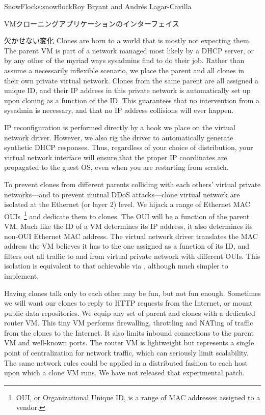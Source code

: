 \begin{aosachapter}{SnowFlock}{s:snowflock}{Roy Bryant and Andr\'e{s} Lagar-Cavilla}
\begin{aosasect1}{VMクローニングアプリケーションのインターフェイス}
\begin{aosasect2}{欠かせない変化}
Clones are born to a world that is mostly not expecting them. The
parent VM is part of a network managed most likely by a DHCP server,
or by any other of the myriad ways sysadmins find to do their
job. Rather than assume a necessarily inflexible scenario, we place
the parent and all clones in their own private virtual network. Clones
from the same parent are all assigned a unique ID, and their IP
address in this private network is automatically set up upon cloning
as a function of the ID\@. This guarantees that no intervention from a
sysadmin is necessary, and that no IP address collisions will ever
happen.

IP reconfiguration is performed directly by a hook we place on the
virtual network driver. However, we also rig the driver to
automatically generate synthetic DHCP responses. Thus, regardless of
your choice of distribution, your virtual network interface will
ensure that the proper IP coordinates are propagated to the guest OS,
even when you are restarting from scratch.

To prevent clones from different parents colliding with each others'
virtual private networks---and to prevent mutual DDoS attacks---clone
virtual network are isolated at the Ethernet (or layer 2) level. We
hijack a range of Ethernet MAC OUIs~\footnote{OUI, or Organizational Unique ID,
is a range of MAC addresses assigned to a vendor.} and dedicate them to clones. The
OUI will be a function of the parent VM\@. Much like the ID of a VM
determines its IP address, it also determines its non-OUI Ethernet MAC
address.  The virtual network driver translates the MAC address the VM
believes it has to the one assigned as a function of its ID, and
filters out all traffic to and from virtual private network with
different OUIs. This isolation is equivalent to that achievable via
, although much simpler to implement.

Having clones talk only to each other may be fun, but not fun enough.
Sometimes we will want our clones to reply to HTTP requests from the
Internet, or mount public data repositories. We equip any set of
parent and clones with a dedicated router VM\@. This tiny VM performs
firewalling, throttling and NATing of traffic from the clones to the
Internet. It also limits inbound connections to the parent VM and
well-known ports.  The router VM is lightweight but represents a
single point of centralization for network traffic, which can
seriously limit scalability. The same network rules could be applied
in a distributed fashion to each host upon which a clone VM runs. We
have not released that experimental patch.


\end{aosasect2}
\end{aosasect1}
\end{aosachapter}
